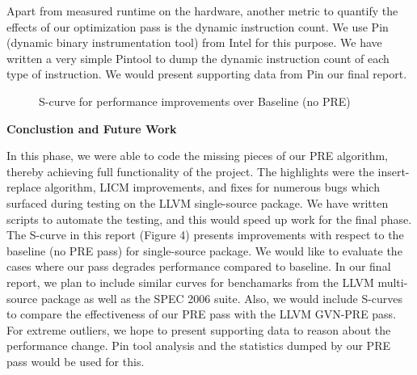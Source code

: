 \documentclass[10pt,twoside]{report}
\begin{document}
Apart from measured runtime on the hardware, another metric to quantify the
effects of our optimization pass is the dynamic instruction count. We use Pin
(dynamic binary instrumentation tool) from Intel for this purpose. We have
written a very simple Pintool to dump the dynamic instruction count of each
type of instruction. We would present supporting data from Pin our final
report.

\begin{figure}
\begin{center}
\end{center}
\label{fig:4}
\caption{S-curve for performance improvements over Baseline (no PRE)}
\end{figure}

\begin{flushleft}
\textbf{\Large{{Conclustion and Future Work }}}
\end{flushleft} 
In this phase, we were able to code the missing pieces of our PRE algorithm,
   thereby achieving full functionality of the project. The highlights were the
   insert-replace algorithm, LICM improvements, and fixes for numerous bugs
   which surfaced during testing on the LLVM single-source package. We have
   written scripts to automate the testing, and this would speed up work for
   the final phase. \\ 
   The S-curve in this report (Figure 4)
   presents improvements with respect to the baseline (no PRE pass) for
   single-source package. We would like to evaluate the cases where our pass
   degrades performance compared to baseline. In our final report, we plan to
   include similar curves for benchamarks from the LLVM multi-source package as
   well as the SPEC 2006 suite. Also, we would include S-curves to compare the
   effectiveness of our PRE pass with the LLVM GVN-PRE pass. For extreme
   outliers, we hope to present supporting data to reason about the performance
   change. Pin tool analysis and the statistics dumped by our PRE pass would be
   used for this.

  
\end{document}
